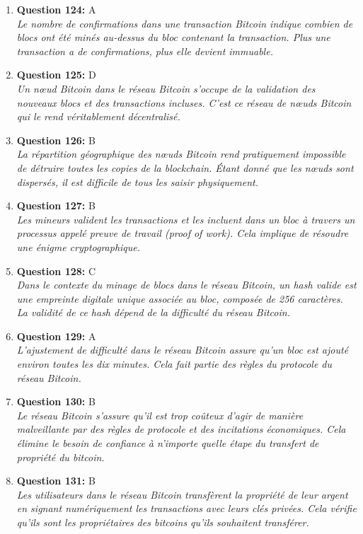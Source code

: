 \documentclass[12pt,a4paper]{article}
\begin{document}
\begin{enumerate}
\item \textbf{Question 124:} A
\\ \textit{Le nombre de confirmations dans une transaction Bitcoin indique combien de blocs ont été minés au-dessus du bloc contenant la transaction. Plus une transaction a de confirmations, plus elle devient immuable.}

\item \textbf{Question 125:} D
\\ \textit{Un nœud Bitcoin dans le réseau Bitcoin s'occupe de la validation des nouveaux blocs et des transactions incluses. C'est ce réseau de nœuds Bitcoin qui le rend véritablement décentralisé.}

\item \textbf{Question 126:} B
\\ \textit{La répartition géographique des nœuds Bitcoin rend pratiquement impossible de détruire toutes les copies de la blockchain. Étant donné que les nœuds sont dispersés, il est difficile de tous les saisir physiquement.}

\item \textbf{Question 127:} B
\\ \textit{Les mineurs valident les transactions et les incluent dans un bloc à travers un processus appelé preuve de travail (proof of work). Cela implique de résoudre une énigme cryptographique.}

\item \textbf{Question 128:} C
\\ \textit{Dans le contexte du minage de blocs dans le réseau Bitcoin, un hash valide est une empreinte digitale unique associée au bloc, composée de 256 caractères. La validité de ce hash dépend de la difficulté du réseau Bitcoin.}

\item \textbf{Question 129:} A
\\ \textit{L'ajustement de difficulté dans le réseau Bitcoin assure qu'un bloc est ajouté environ toutes les dix minutes. Cela fait partie des règles du protocole du réseau Bitcoin.}

\item \textbf{Question 130:} B
\\ \textit{Le réseau Bitcoin s'assure qu'il est trop coûteux d'agir de manière malveillante par des règles de protocole et des incitations économiques. Cela élimine le besoin de confiance à n'importe quelle étape du transfert de propriété du bitcoin.}

\item \textbf{Question 131:} B
\\ \textit{Les utilisateurs dans le réseau Bitcoin transfèrent la propriété de leur argent en signant numériquement les transactions avec leurs clés privées. Cela vérifie qu'ils sont les propriétaires des bitcoins qu'ils souhaitent transférer.}


\end{enumerate}
\end{document}
